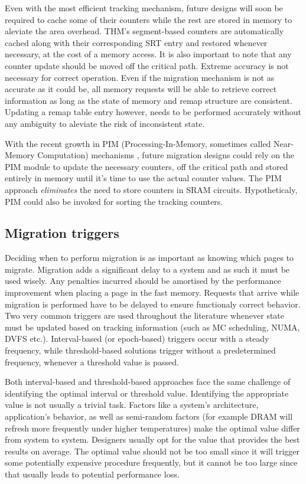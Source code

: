 Even with the most efficient tracking mechanism, future designs will soon be required to cache some of their counters while the rest are stored in memory to aleviate the area overhead. THM's segment-based counters are automatically cached along with their corresponding SRT entry and restored whenever necessary, at the cost of a memory access. It is also important to note that any counter update should be moved off the critical path. Extreme accuracy is not necessary for correct operation. Even if the migration mechanism is not as accurate as it could be, all memory requests will be able to retrieve correct information as long as the state of memory and remap structure are consistent. Updating a remap table entry however, needs to be performed accurately without any ambiguity to aleviate the risk of inconsistent state.

With the recent growth in PIM (Processing-In-Memory, sometimes called Near-Memory Computation) mechanisms \TODO{[cite]}, future migration designs could rely on the PIM module to update the necessary counters, off the critical path and stored entirely in memory until it's time to use the actual counter values. The PIM approach \textit{eliminates} the need to store counters in SRAM circuits. Hypotheticaly, PIM could also be invoked for sorting the tracking counters.

\subsection{Migration triggers}
Deciding when to perform migration is as important as knowing which pages to migrate. Migration adds a significant delay to a system and as such it must be used wisely. Any penalties incurred should be amortised by the performance improvement when placing a page in the fast memory. Requests that arrive while migration is performed have to be delayed to ensure functionaly correct behavior. Two very common triggers are used throughout the literature whenever state must be updated based on tracking information (such as MC scheduling, NUMA, DVFS etc.). Interval-based (or epoch-based) triggers occur with a steady frequency, while threshold-based solutions trigger without a predetermined frequency, whenever a threshold value is passed. 

Both interval-based and threshold-based approaches face the same challenge of identifying the optimal interval or threshold value. Identifying the appropriate value is not usually a trivial task. Factors like a system's architecture, application's behavior, as well as semi-random factors (for example DRAM will refresh more frequently under higher temperatures) make the optimal value differ from system to system. Designers usually opt for the value that provides the best results on average. The optimal value should not be too small since it will trigger some potentially expensive procedure frequently, but it cannot be too large since that usually leads to potential performance loss. 

